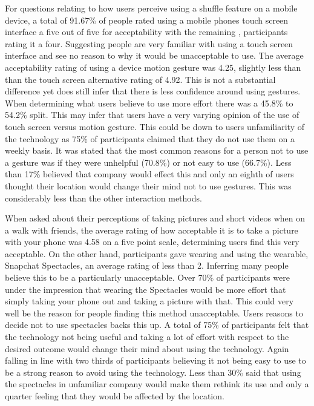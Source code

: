 \documentclass{l4proj}
\begin{document}
For questions relating to how users perceive using a shuffle feature on a mobile device, a total of 91.67\% of people rated using a mobile phones touch screen interface a five out of five for acceptability with the remaining , participants rating it a four. Suggesting people are very familiar with using a touch screen interface and see no reason to why it would be unacceptable to use. The average acceptability rating of using a device motion gesture was 4.25, slightly less than than the touch screen alternative rating of 4.92. This is not a substantial difference yet does still infer that there is less confidence around using gestures. When determining what users believe to use more effort there was a 45.8\% to 54.2\% split. This may infer that users have a very varying opinion of the use of touch screen versus motion gesture. This could be down to users unfamiliarity of the technology as 75\% of participants claimed that they do not use them on a weekly basis. It was stated that the most common reasons for a person not to use a gesture was if they were unhelpful (70.8\%) or not easy to use (66.7\%). Less than 17\% believed that company would effect this and only an eighth of users thought their location would change their mind not to use gestures. This was considerably less than the other interaction methods.

When asked about their perceptions of taking pictures and short videos when on a walk with friends, the average rating of how acceptable it is to take a picture with your phone was 4.58 on a five point scale, determining users find this very acceptable. On the other hand, participants gave wearing and using the wearable, Snapchat Spectacles, an average rating of less than 2. Inferring many people believe this to be a particularly unacceptable. Over 70\% of participants were under the impression that wearing the Spectacles would be more effort that simply taking your phone out and taking a picture with that. This could very well be the reason for people finding this method unacceptable. Users reasons to decide not to use spectacles backs this up. A total of 75\% of participants felt that the technology not being useful and taking a lot of effort with respect to the desired outcome would change their mind about using the technology. Again falling in line with two thirds of participants believing it not being easy to use to be a strong reason to avoid using the technology. Less than 30\% said that using the spectacles in unfamiliar company would make them rethink its use and only a quarter feeling that they would be affected by the location. 
\end{document}
